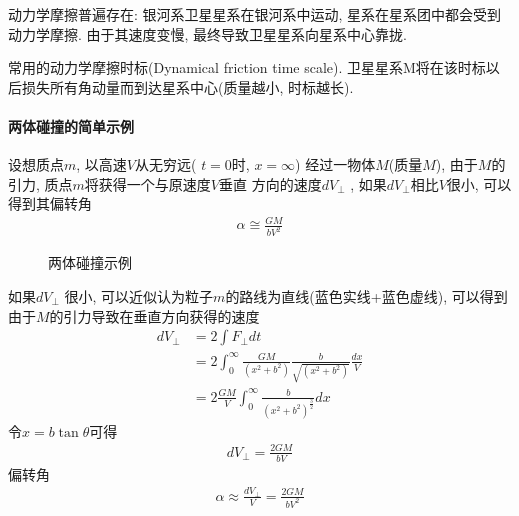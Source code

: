 动力学摩擦普遍存在: 银河系卫星星系在银河系中运动, 星系在星系团中都会受到动力学摩擦. 由于其速度变慢, 最终导致卫星星系向星系中心靠拢. 

常用的动力学摩擦时标(Dynamical friction time scale). 卫星星系M将在该时标以后损失所有角动量而到达星系中心(质量越小, 时标越长).

\paragraph{两体碰撞的简单示例}
设想质点$m$, 以高速$V$从无穷远( $t=0$时, $x= \infty$) 经过一物体$M$(质量$M$), 由于$M$的引力, 质点$m$将获得一个与原速度$V$垂直 方向的速度$dV_\perp$ ,  如果$dV_\perp$相比$V$很小, 可以得到其偏转角
\begin{align*}
    \alpha \cong \frac{GM}{bV^2}
\end{align*}

\begin{figure}[!htb]
    \centering
    \caption{两体碰撞示例}
\end{figure}

如果$dV_\perp$ 很小, 可以近似认为粒子$m$的路线为直线(蓝色实线+蓝色虚线), 可以得到由于$M$的引力导致在垂直方向获得的速度
\begin{align*}
    dV_\perp&= 2\int F_\perp dt \\
    &=2 \int_0^\infty \frac{GM}{(x^2+b^2)}\frac{b}{\sqrt{(x^2+b^2)}}\frac{dx}{V}\\
    &=2\frac{GM}{V}\int_0^\infty\frac{b}{(x^2+b^2)^{\frac{3}{2}}}dx
\end{align*}
令$x=b\tan \theta$可得
\begin{align*}
    dV_\perp=\frac{2GM}{bV}
\end{align*}
偏转角
\begin{align*}
    \alpha \approx \frac{dV_\perp}{V}=\frac{2GM}{bV^2}
\end{align*}

